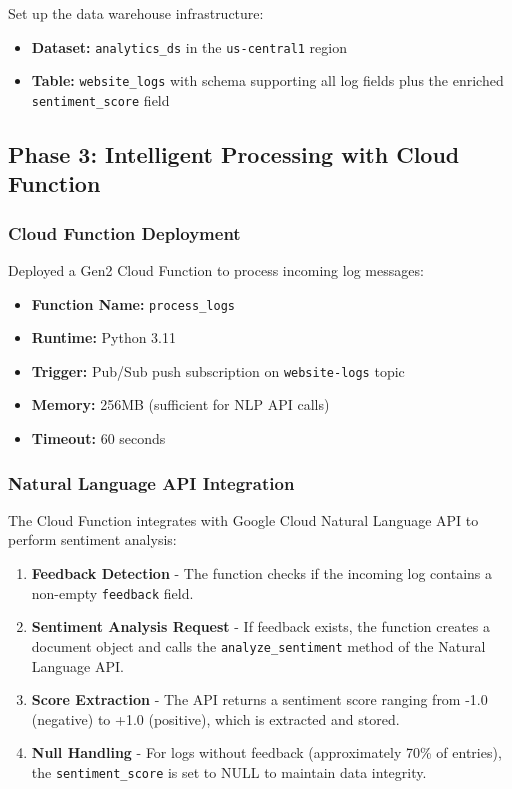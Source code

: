 \documentclass[12pt,a4paper]{article}
\begin{document}
Set up the data warehouse infrastructure:

\begin{itemize}
    \item \textbf{Dataset:} \texttt{analytics\_ds} in the \texttt{us-central1} region
    \item \textbf{Table:} \texttt{website\_logs} with schema supporting all log fields plus the enriched \texttt{sentiment\_score} field
\end{itemize}

\subsection{Phase 3: Intelligent Processing with Cloud Function}

\subsubsection{Cloud Function Deployment}

Deployed a Gen2 Cloud Function to process incoming log messages:

\begin{itemize}
    \item \textbf{Function Name:} \texttt{process\_logs}
    \item \textbf{Runtime:} Python 3.11
    \item \textbf{Trigger:} Pub/Sub push subscription on \texttt{website-logs} topic
    \item \textbf{Memory:} 256MB (sufficient for NLP API calls)
    \item \textbf{Timeout:} 60 seconds
\end{itemize}

\subsubsection{Natural Language API Integration}

The Cloud Function integrates with Google Cloud Natural Language API to perform sentiment analysis:

\begin{enumerate}
    \item \textbf{Feedback Detection} - The function checks if the incoming log contains a non-empty \texttt{feedback} field.
    
    \item \textbf{Sentiment Analysis Request} - If feedback exists, the function creates a document object and calls the \texttt{analyze\_sentiment} method of the Natural Language API.
    
    \item \textbf{Score Extraction} - The API returns a sentiment score ranging from -1.0 (negative) to +1.0 (positive), which is extracted and stored.
    
    \item \textbf{Null Handling} - For logs without feedback (approximately 70\% of entries), the \texttt{sentiment\_score} is set to NULL to maintain data integrity.
\end{enumerate}
\end{document}
